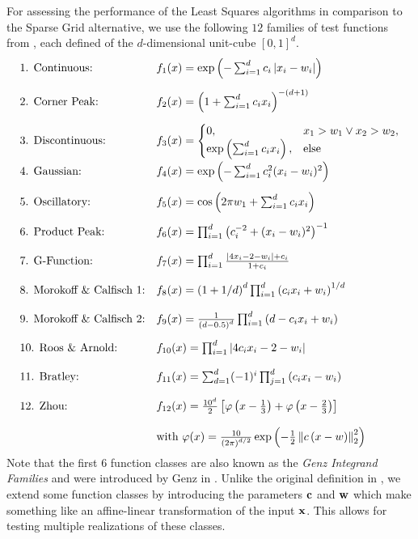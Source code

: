 \documentclass[12pt, oneside]{amsart}
\theoremstyle{definition}
\theoremstyle{remark}
\numberwithin{equation}{section}
\begin{document}
For assessing the performance of the Least Squares algorithms in comparison to 
the Sparse Grid alternative, we use the following $12$ families of test 
functions from \cite{Simulationlib_2013}, each defined of the $d$-dimensional 
unit-cube $[0,1]^d$.
{
	\allowdisplaybreaks[4]
	\begin{align*}
		\begin{array}{l l}
			\text{1. Continuous:} & f_1(x) = \exp\left( - 
			\sum_{i=1}^{d} c_i \abs{x_i - w_i} \right) \\[12pt]
			\text{2. Corner Peak:} & f_2(x) = \left( 1 + 
			\sum_{i=1}^{d} c_i x_i 
			\right)^{-(d+1)} \\[12pt]
			\text{3. Discontinuous:} & f_3(x) = 
			\begin{cases}
				0, &x_1 > w_1 \lor x_2 > w_2, \\
				\exp\left( \sum_{i=1}^{d} c_i x_i \right), & 
				\text{else}
			\end{cases} \\[12pt]
			\text{4. Gaussian:} & f_4(x) = \exp\left( - 
			\sum_{i=1}^{d} c_i^2 (x_i 
			- w_i)^2 \right) \\[12pt]
			\text{5. Oscillatory:} & f_5(x) = \cos\left( 2\pi w_1 + 
			\sum_{i=1}^{d} c_i x_i \right) \\[12pt]
			\text{6. Product Peak:} & f_6(x) = \prod_{i=1}^{d} 
			\left( c_i^{-2} + (x_i - w_i)^2 \right)^{-1} \\[12pt]
			\text{7. G-Function:} & f_7(x) = \prod_{i=1}^{d}
			\frac{\abs{4x_i-2-w_i}+c_i}{1+c_i}
			\\[12pt]
			\text{8. Morokoff \& Calfisch 1:} & f_8(x) = 
			\left(1+1/d\right)^d  
			\prod_{i=1}^{d}\left(c_ix_i+w_i\right)^{1/d}
			\\[12pt]
			\text{9. Morokoff \& Calfisch 2:} & f_9(x) = 
			\frac{1}{\left(d-0.5\right)^d} 
			\prod_{i=1}^{d}\left(d-c_ix_i+w_i\right)
			\\[12pt]
			\text{10. Roos \& Arnold:} & f_{10}(x) = \prod_{i=1}^{d} 
			\abs{4c_ix_i-2-w_i}
			\\[12pt]
			\text{11. Bratley:} & f_{11}(x) = 
			\sum_{d=1}^{d}(-1)^{i}\prod_{j=1}^{d} \left(c_ix_i-w_i\right)
			\\[12pt]
			\text{12. Zhou:} & f_{12}(x) = \frac{10^d}{2} 
			\left[\phi\left(x-\frac13\right)+\phi\left(x-\frac23\right)\right] 
			\\[12pt]
			& \text{with }\phi(x) = 
			\frac{10}{\left(2\pi\right)^{d/2}} 
			\exp \left(-\frac{1}{2}\norm[2]{c\left(x-w\right)}^2\right)
		\end{array}
	\end{align*}
}
Note that the first $6$ function classes are also known as the \emph{Genz 
Integrand Families} and were introduced by Genz in \cite{GenzTesting_1984, 
GenzPackage_1987}. Unlike the original definition in 
\cite{Simulationlib_2013}, we extend some function classes by introducing the 
parameters $\bfc$ and $\bfw$ which make something like an affine-linear 
transformation of the input $\bfx$. 
This allows for testing multiple realizations of these classes.
\end{document}
